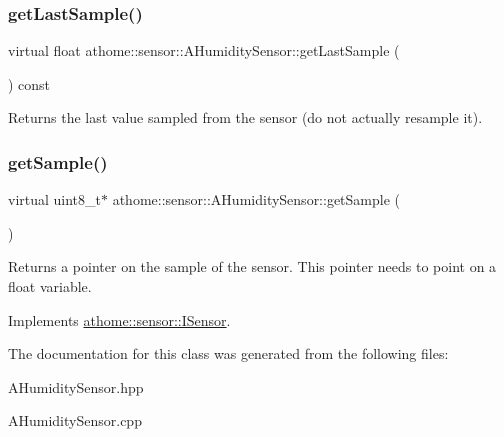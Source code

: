 \mbox{\label{classathome_1_1sensor_1_1_a_humidity_sensor_a35c3e521f1ded20e8c3ba104524c57a0}} 
\subsubsection{\texorpdfstring{get\+Last\+Sample()}{getLastSample()}}
{\footnotesize\ttfamily virtual float athome\+::sensor\+::\+A\+Humidity\+Sensor\+::get\+Last\+Sample (\begin{DoxyParamCaption}{ }\end{DoxyParamCaption}) const\hspace{0.3cm}{\ttfamily [pure virtual]}}

Returns the last value sampled from the sensor (do not actually resample it). \mbox{\label{classathome_1_1sensor_1_1_a_humidity_sensor_a2eb6de3ce2a4aeae0d9e556389d2b329}} 
\subsubsection{\texorpdfstring{get\+Sample()}{getSample()}}
{\footnotesize\ttfamily virtual uint8\+\_\+t$\ast$ athome\+::sensor\+::\+A\+Humidity\+Sensor\+::get\+Sample (\begin{DoxyParamCaption}{ }\end{DoxyParamCaption})\hspace{0.3cm}{\ttfamily [pure virtual]}}

Returns a pointer on the sample of the sensor. This pointer needs to point on a float variable. 

Implements \mbox{\hyperlink{classathome_1_1sensor_1_1_i_sensor_a2513fd8acc5d8251439330ca0e78cf04}{athome\+::sensor\+::\+I\+Sensor}}.



The documentation for this class was generated from the following files\+:\begin{DoxyCompactItemize}
\item 
A\+Humidity\+Sensor.\+hpp\item 
A\+Humidity\+Sensor.\+cpp\end{DoxyCompactItemize}
